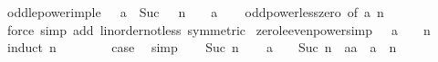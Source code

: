 \begin{isabellebody}
\isamarkupfalse%
%
\endisatagproof
{\isafoldproof}%
%
\isadelimproof
\isanewline
%
\endisadelimproof
\isanewline
{}\isamarkupfalse%
\ odd{\isacharunderscore}{\kern0pt}{}{\isacharunderscore}{\kern0pt}le{\isacharunderscore}{\kern0pt}power{\isacharunderscore}{\kern0pt}imp{\isacharunderscore}{\kern0pt}{}{\isacharunderscore}{\kern0pt}le{\isacharcolon}{\kern0pt}\ {\isachardoublequoteopen}{}\ {\isasymle}\ a\ {\isacharcircum}{\kern0pt}\ Suc\ {\isacharparenleft}{\kern0pt}{}\ {\isacharasterisk}{\kern0pt}\ n{\isacharparenright}{\kern0pt}\ {\isasymLongrightarrow}\ {}\ {\isasymle}\ a{\isachardoublequoteclose}\isanewline
%
\isadelimproof
\ \ %
\endisadelimproof
%
\isatagproof
{}\isamarkupfalse%
\ odd{\isacharunderscore}{\kern0pt}power{\isacharunderscore}{\kern0pt}less{\isacharunderscore}{\kern0pt}zero\ {\isacharbrackleft}{\kern0pt}of\ a\ n{\isacharbrackright}{\kern0pt}\isanewline
\ \ \isamarkupfalse%
\ {\isacharparenleft}{\kern0pt}force\ simp\ add{\isacharcolon}{\kern0pt}\ linorder{\isacharunderscore}{\kern0pt}not{\isacharunderscore}{\kern0pt}less\ {\isacharbrackleft}{\kern0pt}symmetric{\isacharbrackright}{\kern0pt}{\isacharparenright}{\kern0pt}%
\endisatagproof
{\isafoldproof}%
%
\isadelimproof
\isanewline
%
\endisadelimproof
\isanewline
{}\isamarkupfalse%
\ zero{\isacharunderscore}{\kern0pt}le{\isacharunderscore}{\kern0pt}even{\isacharunderscore}{\kern0pt}power{\isacharprime}{\kern0pt}{\isacharbrackleft}{\kern0pt}simp{\isacharbrackright}{\kern0pt}{\isacharcolon}{\kern0pt}\ {\isachardoublequoteopen}{}\ {\isasymle}\ a\ {\isacharcircum}{\kern0pt}\ {\isacharparenleft}{\kern0pt}{}\ {\isacharasterisk}{\kern0pt}\ n{\isacharparenright}{\kern0pt}{\isachardoublequoteclose}\isanewline
%
\isadelimproof
%
\endisadelimproof
%
\isatagproof
{}\isamarkupfalse%
\ {\isacharparenleft}{\kern0pt}induct\ n{\isacharparenright}{\kern0pt}\isanewline
\ \ \isamarkupfalse%
\ {}\isanewline
\ \ \isamarkupfalse%
\ {\isacharquery}{\kern0pt}case\ \isamarkupfalse%
\ simp\isanewline
{}\isamarkupfalse%
\isanewline
\ \ \isamarkupfalse%
\ {\isacharparenleft}{\kern0pt}Suc\ n{\isacharparenright}{\kern0pt}\isanewline
\ \ \isamarkupfalse%
\ {\isachardoublequoteopen}a\ {\isacharcircum}{\kern0pt}\ {\isacharparenleft}{\kern0pt}{}\ {\isacharasterisk}{\kern0pt}\ Suc\ n{\isacharparenright}{\kern0pt}\ {\isacharequal}{\kern0pt}\ {\isacharparenleft}{\kern0pt}a{\isacharasterisk}{\kern0pt}a{\isacharparenright}{\kern0pt}\ {\isacharasterisk}{\kern0pt}\ a\ {\isacharcircum}{\kern0pt}\ {\isacharparenleft}{\kern0pt}{}{\isacharasterisk}{\kern0pt}n{\isacharparenright}{\kern0pt}{\isachardoublequoteclose}\isanewline

\end{isabellebody}
